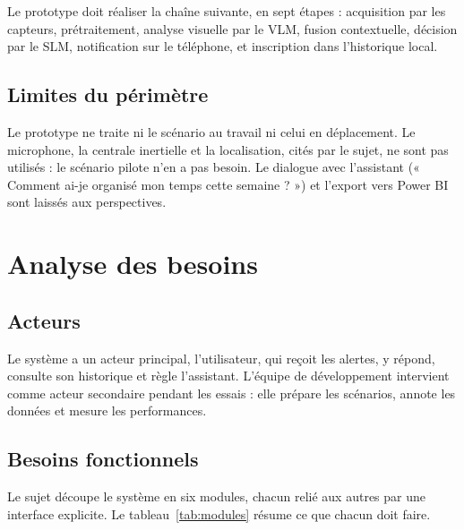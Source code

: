 Le prototype doit réaliser la chaîne suivante, en sept étapes : acquisition par les capteurs, prétraitement,
analyse visuelle par le VLM, fusion contextuelle, décision par le SLM, notification sur le téléphone, et
inscription dans l'historique local.

\subsection{Limites du périmètre}

Le prototype ne traite ni le scénario au travail ni celui en déplacement. Le microphone, la centrale inertielle et
la localisation, cités par le sujet, ne sont pas utilisés : le scénario pilote n'en a pas besoin. Le dialogue avec
l'assistant (« Comment ai-je organisé mon temps cette semaine ? ») et l'export vers Power BI sont laissés aux
perspectives.

\section{Analyse des besoins}

\subsection{Acteurs}

Le système a un acteur principal, l'utilisateur, qui reçoit les alertes, y répond, consulte son historique et
règle l'assistant. L'équipe de développement intervient comme acteur secondaire pendant les essais : elle prépare
les scénarios, annote les données et mesure les performances.

\subsection{Besoins fonctionnels}

Le sujet découpe le système en six modules, chacun relié aux autres par une interface explicite. Le
tableau~\ref{tab:modules} résume ce que chacun doit faire.

